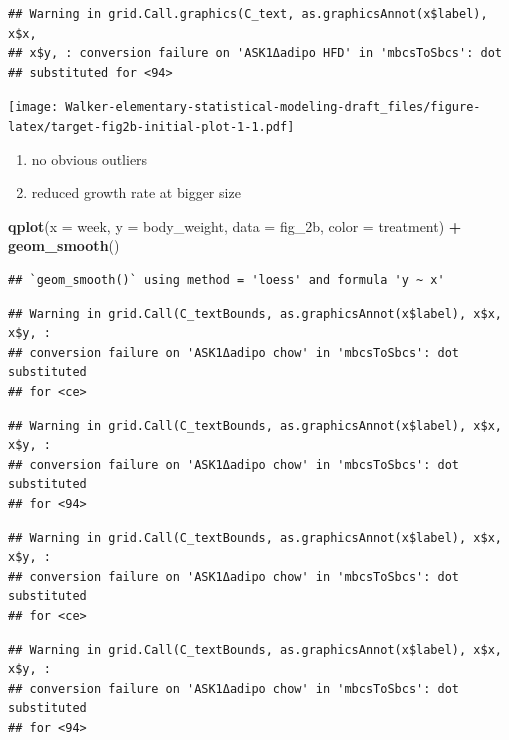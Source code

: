\documentclass[]{book}
\newenvironment{Shaded}{\begin{snugshade}}{\end{snugshade}}
\newcommand{\DataTypeTok}[1]{\textcolor[rgb]{0.13,0.29,0.53}{#1}}
\newcommand{\KeywordTok}[1]{\textcolor[rgb]{0.13,0.29,0.53}{\textbf{#1}}}
\newcommand{\NormalTok}[1]{#1}
\newcommand{\OperatorTok}[1]{\textcolor[rgb]{0.81,0.36,0.00}{\textbf{#1}}}
\newcommand{\StringTok}[1]{\textcolor[rgb]{0.31,0.60,0.02}{#1}}
\providecommand{\tightlist}{%
  \setlength{\itemsep}{0pt}\setlength{\parskip}{0pt}}
\begin{document}
\begin{verbatim}
## Warning in grid.Call.graphics(C_text, as.graphicsAnnot(x$label), x$x,
## x$y, : conversion failure on 'ASK1Δadipo HFD' in 'mbcsToSbcs': dot
## substituted for <94>
\end{verbatim}

\texttt{[image: Walker-elementary-statistical-modeling-draft\_files/figure-latex/target-fig2b-initial-plot-1-1.pdf]}

\begin{enumerate}
\def\labelenumi{\arabic{enumi}.}
\tightlist
\item
  no obvious outliers
\item
  reduced growth rate at bigger size
\end{enumerate}

\begin{Shaded}
\begin{Highlighting}[]
\KeywordTok{qplot}\NormalTok{(}\DataTypeTok{x =}\NormalTok{ week,}
      \DataTypeTok{y =}\NormalTok{ body_weight,}
      \DataTypeTok{data =}\NormalTok{ fig_2b,}
      \DataTypeTok{color =}\NormalTok{ treatment) }\OperatorTok{+}
\StringTok{  }\KeywordTok{geom_smooth}\NormalTok{()}
\end{Highlighting}
\end{Shaded}

\begin{verbatim}
## `geom_smooth()` using method = 'loess' and formula 'y ~ x'
\end{verbatim}

\begin{verbatim}
## Warning in grid.Call(C_textBounds, as.graphicsAnnot(x$label), x$x, x$y, :
## conversion failure on 'ASK1Δadipo chow' in 'mbcsToSbcs': dot substituted
## for <ce>
\end{verbatim}

\begin{verbatim}
## Warning in grid.Call(C_textBounds, as.graphicsAnnot(x$label), x$x, x$y, :
## conversion failure on 'ASK1Δadipo chow' in 'mbcsToSbcs': dot substituted
## for <94>
\end{verbatim}

\begin{verbatim}
## Warning in grid.Call(C_textBounds, as.graphicsAnnot(x$label), x$x, x$y, :
## conversion failure on 'ASK1Δadipo chow' in 'mbcsToSbcs': dot substituted
## for <ce>
\end{verbatim}

\begin{verbatim}
## Warning in grid.Call(C_textBounds, as.graphicsAnnot(x$label), x$x, x$y, :
## conversion failure on 'ASK1Δadipo chow' in 'mbcsToSbcs': dot substituted
## for <94>
\end{verbatim}
\end{document}
